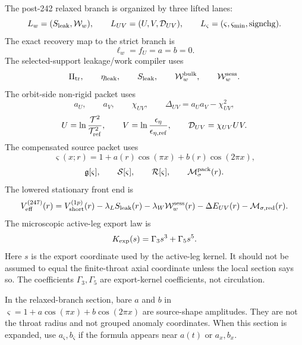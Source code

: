 The post-242 relaxed branch is organized by three lifted lanes:
\begin{equation}
  L_w=(S_{\rm leak},\mathcal W_w),
  \qquad
  L_{UV}=(U,V,\mathcal D_{UV}),
  \qquad
  L_\varsigma=(\varsigma,\varsigma_{\min},\operatorname{signchg}).
\end{equation}
The exact recovery map to the strict branch is
\begin{equation}
  \ell_w=f_U=a=b=0.
\end{equation}
The selected-support leakage/work compiler uses
\begin{equation}
  \Pi_{\rm tr},
  \qquad
  \eta_{\rm leak},
  \qquad
  S_{\rm leak},
  \qquad
  \mathcal W_w^{\rm bulk},
  \qquad
  \mathcal W_w^{\rm sess}.
\end{equation}
The orbit-side non-rigid packet uses
\begin{equation}
  a_U,
  \qquad
  a_V,
  \qquad
  \chi_{UV},
  \qquad
  \Delta_{UV}=a_Ua_V-\chi_{UV}^2,
\end{equation}
\begin{equation}
  U=\ln\frac{\mathcal T^2}{\mathcal T_{\rm ref}^2},
  \qquad
  V=\ln\frac{\epsilon_\eta}{\epsilon_{\eta,{\rm ref}}},
  \qquad
  \mathcal D_{UV}=\chi_{UV}UV.
\end{equation}
The compensated source packet uses
\begin{equation}
  \varsigma(x;r)=1+a(r)\cos(\pi x)+b(r)\cos(2\pi x),
\end{equation}
\begin{equation}
  \mathfrak g[\varsigma],
  \qquad
  \mathcal S[\varsigma],
  \qquad
  \mathcal R[\varsigma],
  \qquad
  \mathcal M_\sigma^{\rm pack}(r).
\end{equation}
The lowered stationary front end is
\begin{equation}
  V_{\rm eff}^{(247)}(r)
  =
  V_{\rm short}^{(1p)}(r)
  -\lambda_LS_{\rm leak}(r)
  -\lambda_W\mathcal W_w^{\rm sess}(r)
  -\Delta E_{UV}(r)
  -\mathcal M_{\sigma,{\rm red}}(r).
\end{equation}
The microscopic active-leg export law is
\begin{equation}
  K_{\rm exp}(s)=\Gamma_3s^3+\Gamma_5s^5.
\end{equation}
Here \(s\) is the export coordinate used by the active-leg kernel.  It should not be assumed to equal the finite-throat axial coordinate unless the local section says so.  The coefficients \(\Gamma_3,\Gamma_5\) are export-kernel coefficients, not circulation.

In the relaxed-branch section, bare \(a\) and \(b\) in \(\varsigma=1+a\cos(\pi x)+b\cos(2\pi x)\) are source-shape amplitudes.  They are not the throat radius and not grouped anomaly coordinates.  When this section is expanded, use \(a_\varsigma,b_\varsigma\) if the formula appears near \(a(t)\) or \(a_x,b_x\).


